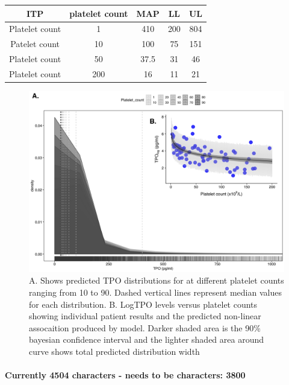 \documentclass[11pt]{article}
\begin{document}
\begin{center}
 \begin{tabular}{||c c c c c||}
 \hline\hline
  ITP   & platelet count & MAP & LL & UL    \\
\hline\hline
 Platelet count & 1 & 410 & 200  & 804 \\
 \hline
 Patelet count & 10 & 100 &  75 & 151 \\
 \hline
 Platelet count & 50 & 37.5 & 31 & 46 \\
 \hline
 Platelet count & 200 & 16 & 11 & 21 \\ [1ex]
 \hline
\end{tabular}
\end{center}

\begin{figure}
\includegraphics[]{ABSTRACT_v1_graph1.png}
\caption{A. Shows predicted TPO distributions for at different platelet counts ranging from 10 to 90. Dashed vertical lines represent median values for each distribution. B. LogTPO levels versus platelet counts showing individual patient results and the predicted non-linear assocaition produced by model. Darker shaded area is the 90\% bayesian confidence interval and the lighter shaded area around curve shows total predicted distribution width}
\end{figure}





\paragraph{}
\textbf{Currently 4504 characters - needs to be characters: 3800}
\end{document}
